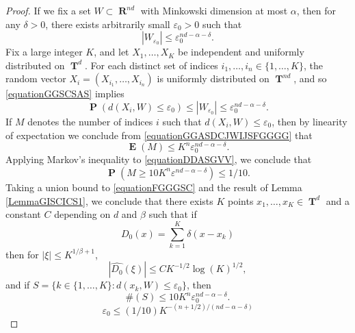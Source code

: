 \documentclass[12pt,reqno]{article}
\numberwithin{equation}{section}
\DeclareMathOperator{\RR}{\mathbf{R}}
\DeclareMathOperator{\TT}{\mathbf{T}}
\DeclareMathOperator{\EE}{\mathbf{E}}
\DeclareMathOperator{\PP}{\mathbf{P}}
\begin{document}
\begin{proof}
    If we fix a set $W \subset \RR^{nd}$ with Minkowski dimension at most $\alpha$, then for any $\delta > 0$, there exists arbitrarily small $\varepsilon_0 > 0$ such that
    \begin{equation} \label{equationGGSCSAS}
        |W_{\varepsilon_0}| \leq \varepsilon_0^{nd - \alpha - \delta}.
    \end{equation}
    Fix a large integer $K$, and let $X_1, \dots, X_K$ be independent and uniformly distributed on $\TT^d$. For each distinct set of indices $i_1, \dots, i_n \in \{ 1, \dots, K \}$, the random vector $X_i = (X_{i_1}, \dots, X_{i_n})$ is uniformly distributed on $\TT^{nd}$, and so \eqref{equationGGSCSAS} implies
    \begin{equation} \label{equationGGASDCJWIJSFGGGG}
        \PP(d(X_i,W) \leq \varepsilon_0) \leq |W_{\varepsilon_0}| \leq \varepsilon_0^{nd - \alpha - \delta}.
    \end{equation}
    If $M$ denotes the number of indices $i$ such that $d(X_i,W) \leq \varepsilon_0$, then by linearity of expectation we conclude from \eqref{equationGGASDCJWIJSFGGGG} that
    \begin{equation} \label{equationDDASGVV}
        \EE(M) \leq K^n \varepsilon_0^{nd - \alpha - \delta}.
    \end{equation}
    Applying Markov's inequality to \eqref{equationDDASGVV}, we conclude that
    \begin{equation} \label{equationFGGGSC}
        \PP(M \geq 10 K^n \varepsilon^{nd - \alpha - \delta}) \leq 1/10.
    \end{equation}
    Taking a union bound to \eqref{equationFGGGSC} and the result of Lemma \ref{LemmaGISCICS1}, we conclude that there exists $K$ points $x_1, \dots, x_K \in \TT^d$ and a constant $C$ depending on $d$ and $\beta$ such that if
    \[ D_0(x) = \sum_{k = 1}^K \delta(x - x_k) \]
    then for $|\xi| \leq K^{1/\beta + 1}$,
    \begin{equation} \label{equationGGGISCI11242}
        |\widehat{D_0}(\xi)| \leq C K^{-1/2} \log(K)^{1/2},
    \end{equation}
    and if $S = \{ k \in \{ 1, \dots, K \}: d(x_k,W) \leq \varepsilon_0 \}$, then
    \begin{equation} \label{equationGGSC99124}
        \#(S) \leq 10 K^n \varepsilon_0^{nd-\alpha-\delta}.
    \end{equation}
    \[ \varepsilon_0 \leq (1/10) K^{-(n + 1/2)/(nd - \alpha - \delta)} \]


\end{proof}
\end{document}

